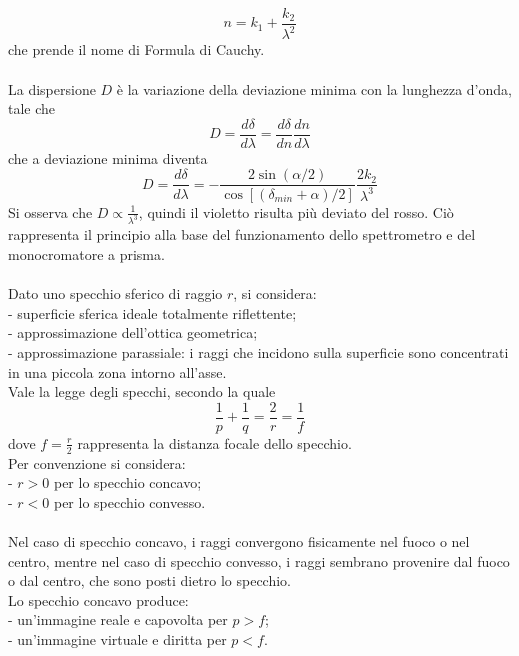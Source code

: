 \documentclass{article}
\begin{document}
\begin{equation}
    n=k_1+\frac{k_2}{\lambda^2}
    \nonumber
\end{equation}
che prende il nome di Formula di Cauchy.\\
\\
La dispersione $D$ è la variazione della deviazione minima con la lunghezza d’onda, tale che
\begin{equation}
    D=\frac{d\delta}{d\lambda}=\frac{d\delta}{dn}\frac{dn}{d\lambda}
    \nonumber
\end{equation}
che a deviazione minima diventa
\begin{equation}
    D=\frac{d\delta}{d\lambda}=-\frac{2\sin(\alpha/2)}{\cos [(\delta_{min}+\alpha)/2]}\frac{2k_2}{\lambda^3}
    \nonumber
\end{equation}
Si osserva che $D\propto\frac{1}{\lambda^3}$, quindi il violetto risulta più deviato del rosso. Ciò rappresenta il principio alla base del funzionamento dello spettrometro e del monocromatore a prisma.\\
\\
Dato uno specchio sferico di raggio $r$, si considera:\\
- superficie sferica ideale totalmente riflettente;\\
- approssimazione dell’ottica geometrica;\\
- approssimazione parassiale: i raggi che incidono sulla superficie sono concentrati in una piccola zona intorno all’asse.\\
Vale la legge degli specchi, secondo la quale
\begin{equation}
    \frac{1}{p}+\frac{1}{q}=\frac{2}{r}=\frac{1}{f}
\end{equation}
dove $f=\frac{r}{2}$ rappresenta la distanza focale dello specchio.\\
Per convenzione si considera:\\
- $r > 0$ per lo specchio concavo;\\
- $r < 0$ per lo specchio convesso.\\
\\
Nel caso di specchio concavo, i raggi convergono fisicamente nel fuoco o nel centro, mentre nel caso di specchio convesso, i raggi sembrano provenire dal fuoco o dal centro, che sono posti dietro lo specchio.\\
Lo specchio concavo produce:\\
- un’immagine reale e capovolta per $p > f$; \\
- un’immagine virtuale e diritta per $p < f$.\\
\end{document}
